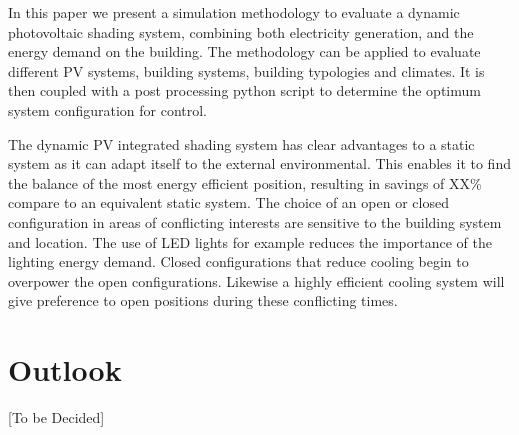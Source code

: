 
In this paper we present a simulation methodology to evaluate a dynamic photovoltaic shading system, combining both electricity generation, and the energy demand on the building. The methodology can be applied to evaluate different PV systems, building systems, building typologies and climates. It is then coupled with a post processing python script to determine the optimum system configuration for control. 

The dynamic PV integrated shading system has clear advantages to a static system as it can adapt itself to the external environmental. This enables it to find the balance of the most energy efficient position, resulting in savings of XX\% compare to an equivalent static system. The choice of an open or closed configuration in areas of conflicting interests are sensitive to the building system and location. The use of LED lights for example reduces the importance of the lighting energy demand. Closed configurations that reduce cooling begin to overpower the open configurations. Likewise a highly efficient cooling system will give preference to open positions during these conflicting times. 


\section{Outlook}
\label{ch:outlook}

[To be Decided]